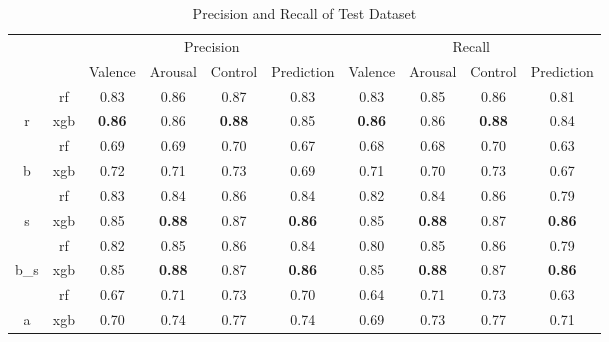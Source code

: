 \begin{table}[t]
\caption{Precision and Recall of Test Dataset} %
\centering
\hspace*{-1.8cm}
\begin{tabular}{cc|c|c|c|c|c|c|c|c|}
\cline{3-10}
 &
   &
  \multicolumn{4}{c|}{Precision} &
  \multicolumn{4}{c|}{Recall} \\ \cline{3-10} 
 &
   &
  Valence &
  Arousal &
  Control &
  Prediction &
  Valence &
  Arousal &
  Control &
  Prediction \\ \hline
\multicolumn{1}{|c|}{} &
  rf &
  0.83 &
  0.86 &
  0.87 &
  0.83 &
  0.83 &
  0.85 &
  0.86 &
  0.81 \\ \cline{2-10} 
\multicolumn{1}{|c|}{\multirow{-2}{*}{r}} &
  xgb &
  \cellcolor[HTML]{FFFC9E}\textbf{0.86} &
  0.86 &
  \cellcolor[HTML]{FFFC9E}\textbf{0.88} &
  0.85 &
  \cellcolor[HTML]{FFFC9E}\textbf{0.86} &
  0.86 &
  \cellcolor[HTML]{FFFC9E}\textbf{0.88} &
  0.84 \\ \hline
\multicolumn{1}{|c|}{} &
  rf &
  0.69 &
  0.69 &
  0.70 &
  0.67 &
  0.68 &
  0.68 &
  0.70 &
  0.63 \\ \cline{2-10} 
\multicolumn{1}{|c|}{\multirow{-2}{*}{b}} &
  xgb &
  0.72 &
  0.71 &
  0.73 &
  0.69 &
  0.71 &
  0.70 &
  0.73 &
  0.67 \\ \hline
\multicolumn{1}{|c|}{} &
  rf &
  0.83 &
  0.84 &
  0.86 &
  0.84 &
  0.82 &
  0.84 &
  0.86 &
  0.79 \\ \cline{2-10} 
\multicolumn{1}{|c|}{\multirow{-2}{*}{s}} &
  xgb &
  0.85 &
  \cellcolor[HTML]{FFFC9E}\textbf{0.88} &
  0.87 &
  \cellcolor[HTML]{FFFC9E}\textbf{0.86} &
  0.85 &
  \cellcolor[HTML]{FFFC9E}\textbf{0.88} &
  0.87 &
  \cellcolor[HTML]{FFFC9E}\textbf{0.86} \\ \hline
\multicolumn{1}{|c|}{} &
  rf &
  0.82 &
  0.85 &
  0.86 &
  0.84 &
  0.80 &
  0.85 &
  0.86 &
  0.79 \\ \cline{2-10} 
\multicolumn{1}{|c|}{\multirow{-2}{*}{b\_s}} &
  xgb &
  0.85 &
  \cellcolor[HTML]{FFFC9E}\textbf{0.88} &
  0.87 &
  \cellcolor[HTML]{FFFC9E}\textbf{0.86} &
  0.85 &
  \cellcolor[HTML]{FFFC9E}\textbf{0.88} &
  0.87 &
  \cellcolor[HTML]{FFFC9E}\textbf{0.86} \\ \hline
\multicolumn{1}{|c|}{} &
  rf &
  0.67 &
  0.71 &
  0.73 &
  0.70 &
  0.64 &
  0.71 &
  0.73 &
  0.63 \\ \cline{2-10} 
\multicolumn{1}{|c|}{\multirow{-2}{*}{a}} &
  xgb &
  0.70 &
  0.74 &
  0.77 &
  0.74 &
  0.69 &
  0.73 &
  0.77 &
  0.71 \\ \hline

\end{tabular}
\end{table}

